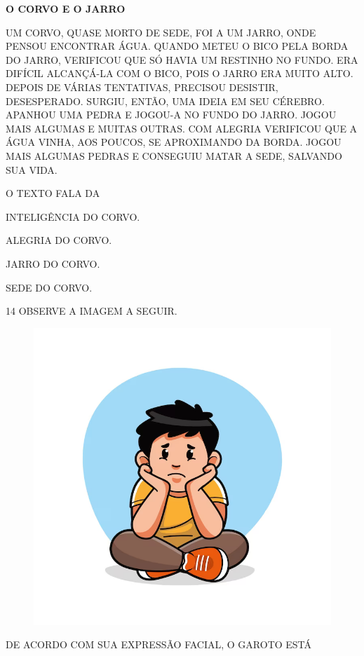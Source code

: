 \begin{myquote}
\textbf{O CORVO E O JARRO}

UM CORVO, QUASE MORTO DE SEDE, FOI A UM JARRO, ONDE PENSOU ENCONTRAR ÁGUA. QUANDO METEU O BICO PELA BORDA DO JARRO, VERIFICOU QUE SÓ HAVIA UM RESTINHO NO FUNDO. ERA DIFÍCIL ALCANÇÁ-LA COM O BICO, POIS O JARRO ERA MUITO ALTO.
DEPOIS DE VÁRIAS TENTATIVAS, PRECISOU DESISTIR, DESESPERADO. SURGIU, ENTÃO, UMA IDEIA EM SEU CÉREBRO.
APANHOU UMA PEDRA E JOGOU-A NO FUNDO DO JARRO. JOGOU MAIS
ALGUMAS E MUITAS OUTRAS.
COM ALEGRIA VERIFICOU QUE A ÁGUA VINHA, AOS POUCOS, SE APROXIMANDO DA BORDA. JOGOU MAIS ALGUMAS PEDRAS E CONSEGUIU MATAR A SEDE, SALVANDO SUA VIDA.

\end{myquote}

O TEXTO FALA DA

\begin{escolha}

\item INTELIGÊNCIA DO CORVO.

\item ALEGRIA DO CORVO.

\item JARRO DO CORVO.

\item SEDE DO CORVO.

\end{escolha}

\num{14} OBSERVE A IMAGEM A SEGUIR.

\begin{figure}[H]
\centering
\includegraphics[width=.5\textwidth]{./media/image237.png}
\end{figure}

\pagebreak
DE ACORDO COM SUA EXPRESSÃO FACIAL, O GAROTO ESTÁ

